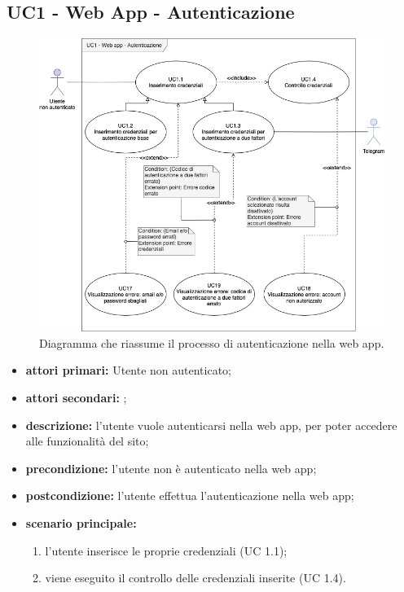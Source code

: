 	\subsection{UC1 - Web App - Autenticazione}
		
	\begin{figure}[H]
		\centering
		\includegraphics[scale=0.60]{res/images/uc1}
		\caption{Diagramma che riassume il processo di autenticazione nella web app.}
	\end{figure}
		
	\begin{itemize}
		\item \textbf{attori primari:} Utente non autenticato;
		\item \textbf{attori secondari:} ;
		\item \textbf{descrizione:} l'utente vuole autenticarsi nella web app, per poter accedere alle funzionalità del sito;
		\item \textbf{precondizione:} l'utente non è autenticato nella web app;
		\item \textbf{postcondizione:} l'utente effettua l'autenticazione nella web app;
		\item \textbf{scenario principale:}
		\begin{enumerate}
			\item l'utente inserisce le proprie credenziali (UC 1.1);
			\item viene eseguito il controllo delle credenziali inserite (UC 1.4).
		\end{enumerate}
	\end{itemize}
	

